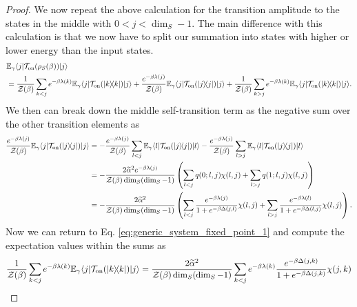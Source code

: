 \documentclass{article}
\newcommand{\on}{\rm on}
\newcommand{\ket}[1]{|#1\rangle}
\newcommand{\bra}[1]{\langle #1|}
\newcommand{\ketbra}[2]{| #1\rangle\! \langle #2|}
\newcommand{\partfun}{\mathcal{Z}}
\begin{document}
\begin{proof}
We now repeat the above calculation for the transition amplitude to the states in the middle with $0 < j < \dim_S - 1$. The main difference with this calculation is that we now have to split our summation into states with higher or lower energy than the input states. 
\begin{align}
    &\mathbb{E}_{\gamma} \bra{j} \mathcal{T}_{\on}(\rho_S(\beta)) \ket{j} \nonumber \\
    &= \frac{1}{\partfun(\beta)} \sum_{k < j} e^{-\beta \lambda(k)} \mathbb{E}_{\gamma} \bra{j} \mathcal{T}_{\on}(\ketbra{k}{k}) \ket{j} + \frac{e^{-\beta \lambda(j)}}{\partfun(\beta)} \mathbb{E}_{\gamma}\bra{j} \mathcal{T}_{\on} (\ketbra{j}{j}) \ket{j} + \frac{1}{\partfun(\beta)} \sum_{k > j} e^{-\beta \lambda(k)} \mathbb{E}_{\gamma} \bra{j} \mathcal{T}_{\on} (\ketbra{k}{k}) \ket{j}. \label{eq:generic_system_fixed_point_1}
\end{align}
We then can break down the middle self-transition term as the negative sum over the other transition elements as
\begin{align}
    \frac{e^{-\beta \lambda(j)}}{\partfun(\beta)} \mathbb{E}_{\gamma}\bra{j} \mathcal{T}_{\on} (\ketbra{j}{j}) \ket{j} &= - \frac{e^{-\beta \lambda(j)}}{\partfun(\beta)} \sum_{l < j} \mathbb{E}_{\gamma} \bra{l} \mathcal{T}_{\on} (\ketbra{j}{j}) \ket{l} - \frac{e^{-\beta \lambda(j)}}{\partfun(\beta)} \sum_{l > j} \mathbb{E}_{\gamma} \bra{l} \mathcal{T}_{\on} (\ketbra{j}{j}) \ket{l} \\
    &= -  \frac{2 \widetilde{\alpha}^2 e^{-\beta \lambda(j)} }{\partfun(\beta) \dim_S(\dim_S - 1)} \left( \sum_{l < j} q(0; l, j) \chi(l, j) + \sum_{l > j} q(1; l, j) \chi(l, j) \right) \\
    &= -  \frac{2 \widetilde{\alpha}^2  }{\partfun(\beta) \dim_S(\dim_S - 1)} \left( \sum_{l < j} \frac{e^{-\beta \lambda(j)}}{1 + e^{-\beta \Delta(j, l)}} \chi(l, j) + \sum_{l > j} \frac{e^{-\beta \lambda(l)}}{1 + e^{-\beta \Delta(l, j)}} \chi(l, j) \right). \label{eq:generic_system_fixed_point_2}
\end{align}
Now we can return to Eq. \eqref{eq:generic_system_fixed_point_1} and compute the expectation values within the sums as
\begin{align}
    \frac{1}{\partfun(\beta)} \sum_{k < j} e^{-\beta \lambda(k)} \mathbb{E}_{\gamma} \bra{j} \mathcal{T}_{\on}(\ketbra{k}{k}) \ket{j} &= \frac{2 \widetilde{\alpha}^2 }{\partfun(\beta) \dim_S(\dim_S - 1) } \sum_{k < j} e^{-\beta \lambda(k)} \frac{e^{-\beta \Delta(j, k)}}{1 + e^{-\beta \Delta(j, k)}} \chi(j, k) \\

\end{align}
\end{proof}
\end{document}
